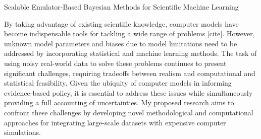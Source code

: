 \documentclass[11pt]{article}
\begin{document}
\begin{center}
Scalable Emulator-Based Bayesian Methods for Scientific Machine Learning
\end{center}

By taking advantage of existing scientific knowledge, computer models have become indispensable tools for tackling a wide range of problems [cite].
However, unknown model parameters and biases due to model limitations need to be addressed by incorporating statistical and machine learning methods. The task of using noisy real-world data to solve these problems continues to present significant challenges, requiring tradeoffs between realism and computational and statistical feasibility. Given the ubiquity of computer models in informing evidence-based policy, it is essential to address these issues while simultaneously providing a full accounting of uncertainties. My proposed research aims to confront these challenges by developing novel methodological and computational approaches for integrating large-scale datasets with expensive computer simulations. 

\end{document}
